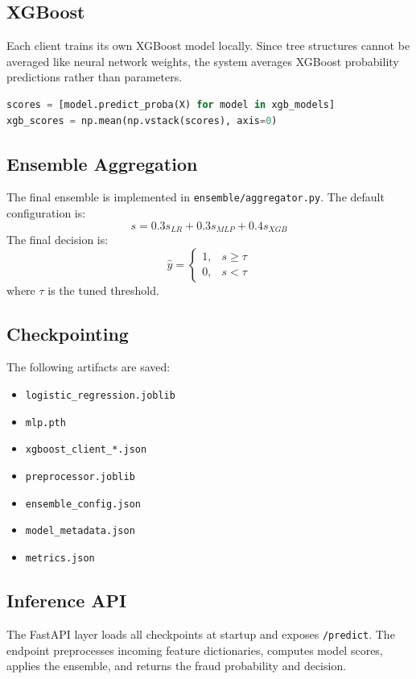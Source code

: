 \subsection{XGBoost}
Each client trains its own XGBoost model locally. Since tree structures cannot be averaged like neural network weights, the system averages XGBoost probability predictions rather than parameters.

\begin{lstlisting}[language=Python, caption={Averaging Client XGBoost Predictions}]
scores = [model.predict_proba(X) for model in xgb_models]
xgb_scores = np.mean(np.vstack(scores), axis=0)
\end{lstlisting}

\subsection{Ensemble Aggregation}
The final ensemble is implemented in \texttt{ensemble/aggregator.py}. The default configuration is:
\begin{equation}
s = 0.3s_{LR} + 0.3s_{MLP} + 0.4s_{XGB}
\end{equation}
The final decision is:
\begin{equation}
\hat{y} =
\begin{cases}
1, & s \geq \tau \\
0, & s < \tau
\end{cases}
\end{equation}
where $\tau$ is the tuned threshold.

\subsection{Checkpointing}
The following artifacts are saved:
\begin{itemize}
    \item \texttt{logistic\_regression.joblib}
    \item \texttt{mlp.pth}
    \item \texttt{xgboost\_client\_*.json}
    \item \texttt{preprocessor.joblib}
    \item \texttt{ensemble\_config.json}
    \item \texttt{model\_metadata.json}
    \item \texttt{metrics.json}
\end{itemize}

\subsection{Inference API}
The FastAPI layer loads all checkpoints at startup and exposes \texttt{/predict}. The endpoint preprocesses incoming feature dictionaries, computes model scores, applies the ensemble, and returns the fraud probability and decision.
